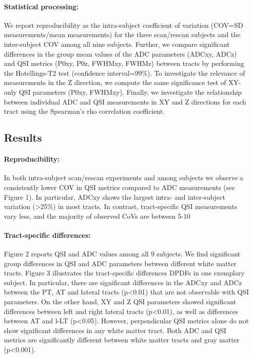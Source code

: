 \paragraph{Statistical processing:} We report reproducibility as the intra-subject coefficient of variation (COV=SD measurements/mean measurements) for the three scan/rescan subjects and the inter-subject COV among all nine subjects. Further, we compare significant differences in the group mean values of the ADC parameters (ADCxy, ADCz) and QSI metrics (P0xy, P0z, FWHMxy, FWHMz) between tracts by performing the Hotellings-T2 test (confidence interval=99\%). To investigate the relevance of measurements in the Z direction, we compute the same significance test of XY-only QSI parameters (P0xy, FWHMxy). Finally, we investigate the relationship between individual ADC and QSI measurements in XY and Z directions for each tract using the Spearman’s rho correlation coefficient. 
\subsection*{Results}
\paragraph{Reproducibility:} In both intra-subject scan/rescan experiments and among subjects we observe a consistently lower COV in QSI metrics compared to ADC measurements (see Figure 1). In particular, ADCxy shows the largest intra- and inter-subject variation (>25\%) in most tracts. In contrast, tract-specific QSI measurements vary less, and the majority of observed CoVs are between 5-10%
\paragraph{Tract-specific differences:} Figure 2 reports QSI and ADC values among all 9 subjects. We find significant group differences in QSI and ADC parameters between different white matter tracts. Figure 3 illustrates the tract-specific differences DPDFs in one exemplary subject. In particular, there are significant differences in the ADCxy and ADCz between the PT, AT and lateral tracts (p<0.01) that are not observable with QSI parameters. On the other hand, XY and Z QSI parameters showed significant differences between left and right lateral tracts (p<0.01), as well as differences between AT and l-LT (p<0.05). However, perpendicular QSI metrics alone do not show significant differences in any white matter tract. Both ADC and QSI metrics are significantly different between white matter tracts and gray matter (p<0.001).

